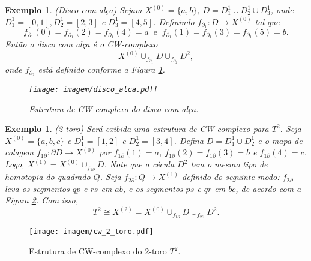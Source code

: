 \documentclass[12pt]{book}
\newtheorem{exemplo}[teorema]{Exemplo}
\newcommand{\skeleton}[1]{X^{(#1)}}
\begin{document}
	
	\begin{exemplo}
		(Disco com alça) Sejam $\skeleton{0}=\{a,b\}$, $D = D^{1}_{1}\cup D^{1}_{2}\cup D^{1}_{3}$, onde $D^{1}_{1} = [0,1],D^{1}_{2} = [2,3]$ e $D^{1}_{3} = [4,5]$. Definindo $f_{\partial_{1}}: D \to \skeleton{0}$ tal que 
		$$
		f_{\partial_{1}}(0)=f_{\partial_{1}}(2)=f_{\partial_{1}}(4)=a \;\;\text{e}\;\;
		f_{\partial_{1}}(1)=f_{\partial_{1}}(3)=f_{\partial_{1}}(5)=b.
		$$
		Então o disco com alça é o CW-complexo
		$$
		\skeleton{0} \cup_{f_{\partial_{1}}}D \cup_{f_{\partial_{2}}}D^{2},
		$$
		onde $f_{\partial_{2}}$ está definido conforme a Figura \ref{figura_cw_disco_com_alca}.
		
		\begin{figure}[!h]
			\centering
			\texttt{[image: imagem/disco\_alca.pdf]}
			\caption{Estrutura de CW-complexo do disco com alça.}
			\label{figura_cw_disco_com_alca}
		\end{figure}   
	\end{exemplo}
	
	\begin{exemplo}\label{exemplo_cw_toro}
		(2-toro) Será exibida uma estrutura de CW-complexo para $T^{2}$. Seja $\skeleton{0} = \{a,b,c\}$ e $D^{1}_{1} = [1,2]$ e $D^{1}_{2} = [3,4]$. Defina $D = D^{1}_{1}\cup D^{1}_{2}$ e o mapa de colagem $f_{1\partial}: \partial D\to \skeleton{0}$ por $f_{1\partial}(1) = a$, $f_{1\partial}(2) = f_{1\partial}(3) = b$ e $f_{1\partial}(4)=c$. Logo, $\skeleton{1} = \skeleton{0}\cup_{f_{1\partial}} D$. Note que a cécula $D^{2}$ tem o mesmo tipo de homotopia do quadrado $Q$. Seja $f_{2\partial}: Q\to \skeleton{1}$ definido do seguinte modo: $f_{2\partial}$ leva os segmentos $qp$ e $rs$ em $ab$, e os segmentos $ps$ e $qr$ em $bc$, de acordo com a Figura \ref{figura_cw_2_toro}. Com isso, 
		$$
		T^{2} \cong \skeleton{2} = \skeleton{0}\cup_{f_{1\partial}}D \cup_{f_{2\partial}}D^{2}.
		$$
	\end{exemplo}
	
	\begin{figure}[!h]
		\centering
		\texttt{[image: imagem/cw\_2\_toro.pdf]}
		\caption{Estrutura de CW-complexo do 2-toro $T^{2}$.}
		\label{figura_cw_2_toro}
	\end{figure} 
	
\end{document}

